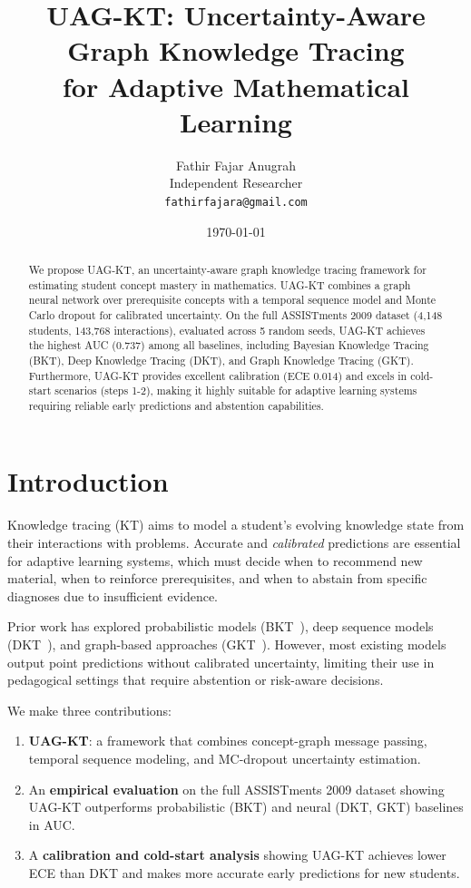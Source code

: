 \documentclass[11pt]{article}
\title{
  \textbf{UAG-KT: Uncertainty-Aware Graph Knowledge Tracing \\
  for Adaptive Mathematical Learning}
}
\author{Fathir Fajar Anugrah \\ Independent Researcher \\ \texttt{fathirfajara@gmail.com}}
\date{\today}
\begin{document}
\maketitle

\begin{abstract}
We propose UAG-KT, an uncertainty-aware graph knowledge tracing framework for estimating student concept mastery in mathematics. UAG-KT combines a graph neural network over prerequisite concepts with a temporal sequence model and Monte Carlo dropout for calibrated uncertainty. On the full ASSISTments 2009 dataset (4,148 students, 143,768 interactions), evaluated across 5 random seeds, UAG-KT achieves the highest AUC (0.737) among all baselines, including Bayesian Knowledge Tracing (BKT), Deep Knowledge Tracing (DKT), and Graph Knowledge Tracing (GKT). Furthermore, UAG-KT provides excellent calibration (ECE 0.014) and excels in cold-start scenarios (steps 1-2), making it highly suitable for adaptive learning systems requiring reliable early predictions and abstention capabilities.
\end{abstract}

\section{Introduction}
Knowledge tracing (KT) aims to model a student's evolving knowledge state from their interactions with problems. Accurate and \emph{calibrated} predictions are essential for adaptive learning systems, which must decide when to recommend new material, when to reinforce prerequisites, and when to abstain from specific diagnoses due to insufficient evidence.

Prior work has explored probabilistic models (BKT~\cite{corbett1994}), deep sequence models (DKT~\cite{piech2015}), and graph-based approaches (GKT~\cite{nakagawa2019}). However, most existing models output point predictions without calibrated uncertainty, limiting their use in pedagogical settings that require abstention or risk-aware decisions.

We make three contributions:
\begin{enumerate}
\item \textbf{UAG-KT}: a framework that combines concept-graph message passing, temporal sequence modeling, and MC-dropout uncertainty estimation.
\item An \textbf{empirical evaluation} on the full ASSISTments 2009 dataset showing UAG-KT outperforms probabilistic (BKT) and neural (DKT, GKT) baselines in AUC.
\item A \textbf{calibration and cold-start analysis} showing UAG-KT achieves lower ECE than DKT and makes more accurate early predictions for new students.
\end{enumerate}
\end{document}

